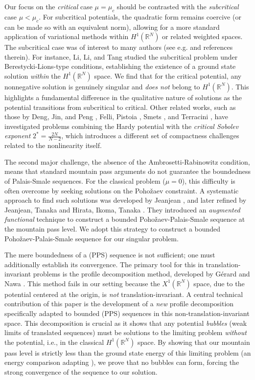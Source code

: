 \documentclass[12pt,leqno,twoside,sort]{amsart}
\newcommand{\R}{\mathbb{R}}
\numberwithin{equation}{section}
\begin{document}
Our focus on the \textit{critical} case $\mu = \mu_c$ should be contrasted with the \textit{subcritical} case $\mu < \mu_c$. For subcritical potentials, the quadratic form remains coercive (or can be made so with an equivalent norm), allowing for a more standard application of variational methods within $H^1(\R^N)$ or related weighted spaces. The subcritical case was of interest to many authors (see e.g. \cite{GuoMederski, LiLiTang, MR3989664} and references therein). For instance, Li, Li, and Tang \cite{LiLiTang} studied the subcritical problem under Berestycki-Lions-type conditions, establishing the existence of a ground state solution \textit{within} the $H^1(\R^N)$ space. We find that for the critical potential, any nonnegative solution is genuinely singular and \textit{does not} belong to $H^1(\R^N)$. This highlights a fundamental difference in the qualitative nature of solutions as the potential transitions from subcritical to critical. Other related works, such as those by Deng, Jin, and Peng \cite{Deng}, Felli, Pistoia \cite{Felli}, Smets \cite{Smets}, and Terracini \cite{Terracini96}, have investigated problems combining the Hardy potential with the \textit{critical Sobolev exponent} $2^* = \frac{2N}{N-2}$, which introduces a different set of compactness challenges related to the nonlinearity itself.

The second major challenge, the absence of the Ambrosetti-Rabinowitz condition, means that standard mountain pass arguments do not guarantee the boundedness of Palais-Smale sequences. For the classical problem ($\mu=0$), this difficulty is often overcome by seeking solutions on the Pohožaev constraint. A systematic approach to find such solutions was developed by Jeanjean \cite{Jeanjean}, and later refined by Jeanjean, Tanaka \cite{JeanjeanTanaka} and Hirata, Ikoma, Tanaka \cite{HirataIkomaTanaka}. They introduced an \textit{augmented functional} technique to construct a bounded Poho\v{z}aev-Palais-Smale sequence at the mountain pass level. We adopt this strategy to construct a bounded Poho\v{z}aev-Palais-Smale sequence for our singular problem.


The mere boundedness of a (PPS) sequence is not sufficient; one must additionally establish its convergence. The primary tool for this in translation-invariant problems is the profile decomposition method, developed by Gérard \cite{Gerard} and Nawa \cite{Nawa}. This method fails in our setting because the $X^1(\R^N)$ space, due to the potential centered at the origin, is \textit{not} translation-invariant. A central technical contribution of this paper is the development of a \textit{new} profile decomposition specifically adapted to bounded (PPS) sequences in this non-translation-invariant space. This decomposition is crucial as it shows that any potential \textit{bubbles} (weak limits of translated sequences) must be solutions to the limiting problem \textit{without} the potential, i.e., in the classical $H^1(\R^N)$ space. By showing that our mountain pass level is strictly less than the ground state energy of this limiting problem (an energy comparison adapting \cite{JeanjeanTanaka}), we prove that no bubbles can form, forcing the strong convergence of the sequence to our solution.
\end{document}
